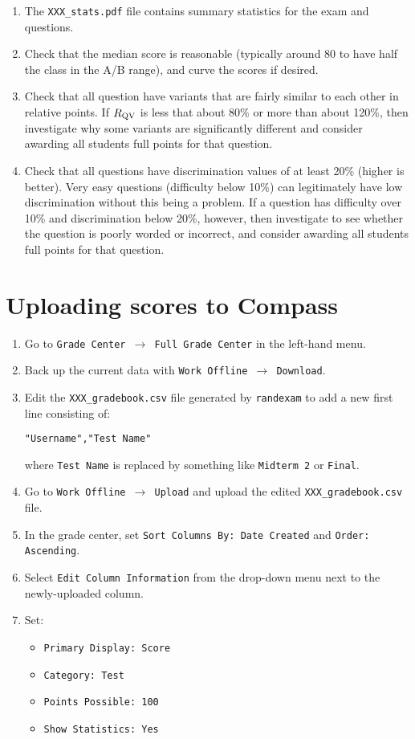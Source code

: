 \documentclass{article}
\begin{document}
\begin{enumerate}
\item The \texttt{XXX_stats.pdf} file contains summary statistics for
  the exam and questions.
\item Check that the median score is reasonable (typically around 80
  to have half the class in the A/B range), and curve the scores if
  desired.
\item Check that all question have variants that are fairly similar to
  each other in relative points. If $R_{\rm QV}$ is less that about
  80\% or more than about 120\%, then investigate why some variants
  are significantly different and consider awarding all students full
  points for that question.
\item Check that all questions have discrimination values of at least
  20\% (higher is better). Very easy questions (difficulty below 10\%)
  can legitimately have low discrimination without this being a
  problem. If a question has difficulty over 10\% and discrimination
  below 20\%, however, then investigate to see whether the question is
  poorly worded or incorrect, and consider awarding all students full
  points for that question.
\end{enumerate}

\section{Uploading scores to Compass}

\begin{enumerate}
\item Go to \texttt{Grade Center $\to$ Full Grade Center} in the
  left-hand menu.
\item Back up the current data with \texttt{Work Offline $\to$
    Download}.
\item Edit the \texttt{XXX_gradebook.csv} file generated by
  \texttt{randexam} to add a new first line consisting of:
  \begin{center}
    \texttt{"Username","Test Name"}
  \end{center}
  where \texttt{Test Name} is replaced by something like
  \texttt{Midterm 2} or \texttt{Final}.
\item Go to \texttt{Work Offline $\to$ Upload} and upload the edited
  \texttt{XXX_gradebook.csv} file.
\item In the grade center, set \texttt{Sort Columns By: Date Created}
  and \texttt{Order: Ascending}.
\item Select \texttt{Edit Column Information} from the drop-down menu
  next to the newly-uploaded column.
\item Set:
  \begin{itemize}
  \item \texttt{Primary Display: Score}
  \item \texttt{Category: Test}
  \item \texttt{Points Possible: 100}
  \item \texttt{Show Statistics: Yes}
  \end{itemize}
\end{enumerate}
\end{document}
